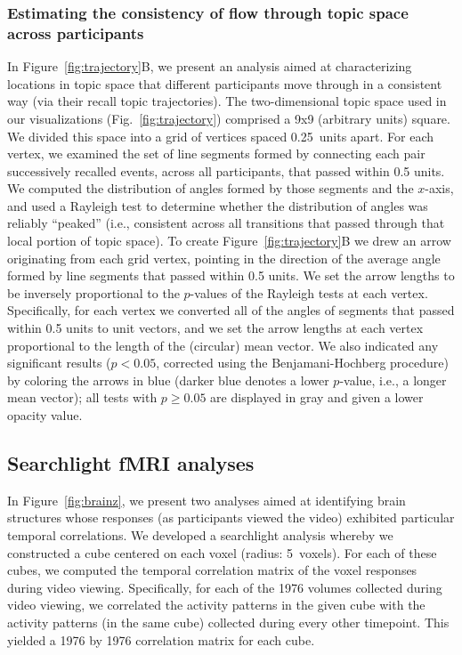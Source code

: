 \documentclass{article}
\begin{document}
\subsubsection*{Estimating the consistency of flow through topic space across participants}
In Figure~\ref{fig:trajectory}B, we present an analysis aimed at characterizing locations in topic space that different participants move through in a consistent way (via their recall topic trajectories).  The two-dimensional topic space used in our visualizations (Fig.~\ref{fig:trajectory}) comprised a 9x9 (arbitrary units) square.  We divided this space into a grid of vertices spaced 0.25~units apart.  For each vertex, we examined the set of line segments formed by connecting each pair successively recalled events, across all participants, that passed within 0.5 units.  We computed the distribution of angles formed by those segments and the $x$-axis, and used a Rayleigh test to determine whether the distribution of angles was reliably ``peaked'' (i.e., consistent across all transitions that passed through that local portion of topic space).  To create Figure~\ref{fig:trajectory}B we drew an arrow originating from each grid vertex, pointing in the direction of the average angle formed by line segments that passed within 0.5 units.  We set the arrow lengths to be inversely proportional to the $p$-values of the Rayleigh tests at each vertex.  Specifically, for each vertex we converted all of the angles of segments that passed within 0.5 units to unit vectors, and we set the arrow lengths at each vertex proportional to the length of the (circular) mean vector.  We also indicated any significant results ($p < 0.05$, corrected using the Benjamani-Hochberg procedure) by coloring the arrows in blue (darker blue denotes a lower $p$-value, i.e., a longer mean vector); all tests with $p \geq 0.05$ are displayed in gray and given a lower opacity value.

\subsection*{Searchlight fMRI analyses}
In Figure~\ref{fig:brainz}, we present two analyses aimed at identifying brain structures whose responses (as participants viewed the video) exhibited particular temporal correlations.  We developed a searchlight analysis whereby we constructed a cube centered on each voxel (radius: 5~voxels).  For each of these cubes, we computed the temporal correlation matrix of the voxel responses during video viewing.  Specifically, for each of the 1976 volumes collected during video viewing, we correlated the activity patterns in the given cube with the activity patterns (in the same cube) collected during every other timepoint.  This yielded a 1976 by 1976 correlation matrix for each cube.
\end{document}
